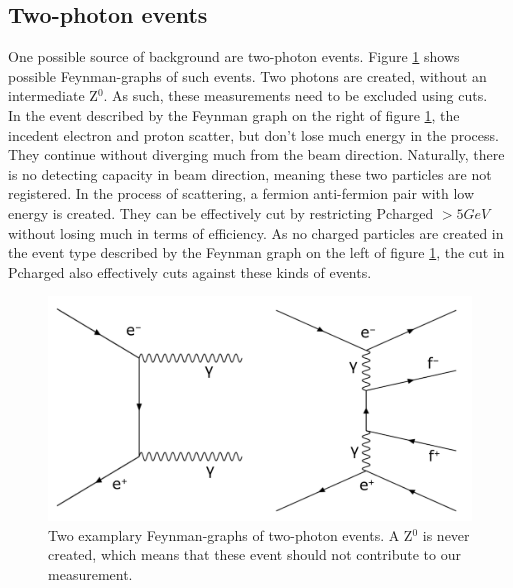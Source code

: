 \subsection{Two-photon events}
One possible source of background are two-photon events. Figure \ref{fig:twophotonfeynman} shows possible Feynman-graphs of such events. Two photons are created, without an intermediate Z$^0$. As such, these measurements need to be excluded using cuts.\\
In the event described by the Feynman graph on the right of figure \ref{fig:twophotonfeynman}, the incedent electron and proton scatter, but don't lose much energy in the process. They continue without diverging much from the beam direction. Naturally, there is no detecting capacity in beam direction, meaning these two particles are not registered. In the process of scattering, a fermion anti-fermion pair with low energy is created. They can be effectively cut by restricting Pcharged $> \unit{5}{GeV}$ without losing much in terms of efficiency.
As no charged particles are created in the event type described by the Feynman graph on the left of figure \ref{fig:twophotonfeynman}, the cut in Pcharged also effectively cuts against these kinds of events.
\begin{figure}[H]
\centering
\includegraphics[width=1.0\linewidth]{graphics/twophotonfeynman_both.pdf}
\caption[Two-photon Feynman-graph]{Two examplary Feynman-graphs of two-photon events. A Z$^0$ is never created, which means that these event should not contribute to our measurement.}
\label{fig:twophotonfeynman}
\end{figure}

